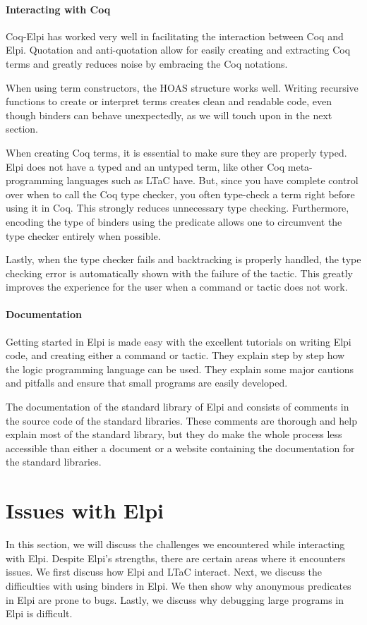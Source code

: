 \documentclass[thesis.tex]{subfiles}
\begin{document}
\paragraph{Interacting with Coq}
Coq-Elpi has worked very well in facilitating the interaction between Coq and Elpi. Quotation and anti-quotation allow for easily creating and extracting Coq terms and greatly reduces noise by embracing the Coq notations.

When using term constructors, the HOAS structure works well. Writing recursive functions to create or interpret terms creates clean and readable code, even though binders can behave unexpectedly, as we will touch upon in the next section.

When creating Coq terms, it is essential to make sure they are properly typed. Elpi does not have a typed and an untyped term, like other Coq meta-programming languages such as LTaC have. But, since you have complete control over when to call the Coq type checker, you often type-check a term right before using it in Coq. This strongly reduces unnecessary type checking. Furthermore, encoding the type of binders using the  predicate allows one to circumvent the type checker entirely when possible.

Lastly, when the type checker fails and backtracking is properly handled, the type checking error is automatically shown with the failure of the tactic. This greatly improves the experience for the user when a command or tactic does not work.

\paragraph{Documentation}
Getting started in Elpi is made easy with the excellent tutorials on writing Elpi code, and creating either a command or tactic. They explain step by step how the logic programming language can be used. They explain some major cautions and pitfalls and ensure that small programs are easily developed.

The documentation of the standard library of Elpi and \ce consists of comments in the source code of the standard libraries. These comments are thorough and help explain most of the standard library, but they do make the whole process less accessible than either a document or a website containing the documentation for the standard libraries.

\section{Issues with Elpi}\label{sec:elpibad}
In this section, we will discuss the challenges we encountered while interacting with Elpi. Despite Elpi's strengths, there are certain areas where it encounters issues. We first discuss how Elpi and LTaC interact. Next, we discuss the difficulties with using binders in Elpi. We then show why anonymous predicates in Elpi are prone to bugs. Lastly, we discuss why debugging large programs in Elpi is difficult.
\end{document}
